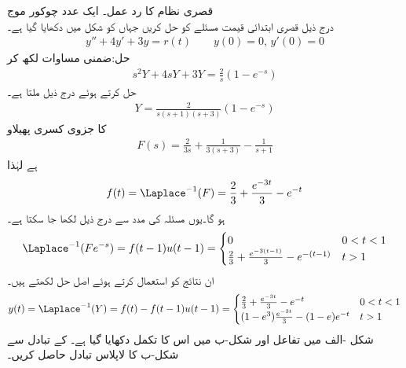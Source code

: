 \quad قصری نظام کا رد عمل۔ ایک عدد چوکور موج\\
درج ذیل قصری ابتدائی قیمت مسئلے کو حل کریں جہاں  کو شکل  میں دکھایا گیا ہے۔
\begin{align*}
y''+4y'+3y=r(t) \quad \quad y(0)=0, \, y'(0)=0
\end{align*}
حل:ضمنی مساوات لکھ کر
\begin{align*}
s^2Y+4sY+3Y=\frac{2}{s}(1-e^{-s})
\end{align*}
حل کرتے ہوئے درج ذیل ملتا ہے۔
\begin{align*}
Y=\frac{2}{s(s+1)(s+3)}(1-e^{-s})
\end{align*}
 کا جزوی کسری پھیلاو 
\begin{align*}
F(s)=\frac{2}{3s}+\frac{1}{3(s+3)}-\frac{1}{s+1}
\end{align*}
  ہے لہٰذا
\begin{align*}
f(t)=\Laplace^{-1}(F)=\frac{2}{3}+\frac{e^{-3t}}{3}-e^{-t}
\end{align*}
ہو گا۔یوں مسئلہ  کی مدد سے درج ذیل لکھا جا سکتا ہے۔
\begin{align*}
\Laplace^{-1}(Fe^{-s})=f(t-1)u(t-1)=
\begin{cases}
0& 0<t<1\\
\frac{2}{3}+\frac{e^{-3(t-1)}}{3}-e^{-(t-1)} & t>1
\end{cases}
\end{align*}
ان نتائج کو استعمال کرتے ہوئے اصل حل لکھتے ہیں۔
\begin{align*}
y(t)=\Laplace^{-1}(Y)=f(t)-f(t-1)u(t-1)=
\begin{cases}
\frac{2}{3}+\frac{e^{-3t}}{3}-e^{-t} & 0<t<1\\
(1-e^3)\frac{e^{-3t}}{3}-(1-e)e^{-t}& t>1
\end{cases}
\end{align*}
شکل -الف میں تفاعل  اور شکل-ب میں اس کا تکمل دکھایا گیا ہے۔ کے تبادل سے  شکل-ب کا لاپلاس تبادل حاصل کریں۔
